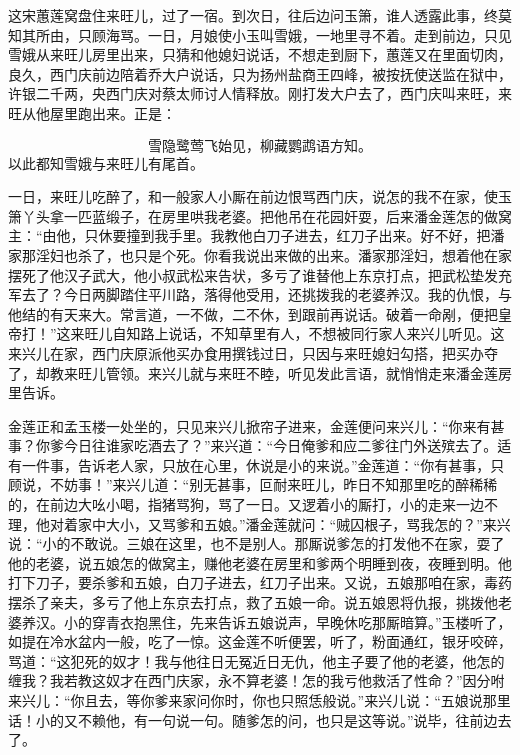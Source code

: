 这宋蕙莲窝盘住来旺儿，过了一宿。到次日，往后边问玉箫，谁人透露此事，终莫知其所由，只顾海骂。一日，月娘使小玉叫雪娥，一地里寻不着。走到前边，只见雪娥从来旺儿房里出来，只猜和他媳妇说话，不想走到厨下，蕙莲又在里面切肉，良久，西门庆前边陪着乔大户说话，只为扬州盐商王四峰，被按抚使送监在狱中，许银二千两，央西门庆对蔡太师讨人情释放。刚打发大户去了，西门庆叫来旺，来旺从他屋里跑出来。正是：

\[
雪隐鹭莺飞始见，柳藏鹦鹉语方知。
\]
以此都知雪娥与来旺儿有尾首。

一日，来旺儿吃醉了，和一般家人小厮在前边恨骂西门庆，说怎的我不在家，使玉箫丫头拿一匹蓝缎子，在房里哄我老婆。把他吊在花园奸耍，后来潘金莲怎的做窝主：“由他，只休要撞到我手里。我教他白刀子进去，红刀子出来。好不好，把潘家那淫妇也杀了，也只是个死。你看我说出来做的出来。潘家那淫妇，想着他在家摆死了他汉子武大，他小叔武松来告状，多亏了谁替他上东京打点，把武松垫发充军去了？今日两脚踏住平川路，落得他受用，还挑拨我的老婆养汉。我的仇恨，与他结的有天来大。常言道，一不做，二不休，到跟前再说话。破着一命剐，便把皇帝打！”这来旺儿自知路上说话，不知草里有人，不想被同行家人来兴儿听见。这来兴儿在家，西门庆原派他买办食用撰钱过日，只因与来旺媳妇勾搭，把买办夺了，却教来旺儿管领。来兴儿就与来旺不睦，听见发此言语，就悄悄走来潘金莲房里告诉。

金莲正和孟玉楼一处坐的，只见来兴儿掀帘子进来，金莲便问来兴儿：“你来有甚事？你爹今日往谁家吃酒去了？”来兴道：“今日俺爹和应二爹往门外送殡去了。适有一件事，告诉老人家，只放在心里，休说是小的来说。”金莲道：“你有甚事，只顾说，不妨事！”来兴儿道：“别无甚事，叵耐来旺儿，昨日不知那里吃的醉稀稀的，在前边大吆小喝，指猪骂狗，骂了一日。又逻着小的厮打，小的走来一边不理，他对着家中大小，又骂爹和五娘。”潘金莲就问：“贼囚根子，骂我怎的？”来兴说：“小的不敢说。三娘在这里，也不是别人。那厮说爹怎的打发他不在家，耍了他的老婆，说五娘怎的做窝主，赚他老婆在房里和爹两个明睡到夜，夜睡到明。他打下刀子，要杀爹和五娘，白刀子进去，红刀子出来。又说，五娘那咱在家，毒药摆杀了亲夫，多亏了他上东京去打点，救了五娘一命。说五娘恩将仇报，挑拨他老婆养汉。小的穿青衣抱黑住，先来告诉五娘说声，早晚休吃那厮暗算。”玉楼听了，如提在冷水盆内一般，吃了一惊。这金莲不听便罢，听了，粉面通红，银牙咬碎，骂道：“这犯死的奴才！我与他往日无冤近日无仇，他主子要了他的老婆，他怎的缠我？我若教这奴才在西门庆家，永不算老婆！怎的我亏他救活了性命？”因分咐来兴儿：“你且去，等你爹来家问你时，你也只照恁般说。”来兴儿说：“五娘说那里话！小的又不赖他，有一句说一句。随爹怎的问，也只是这等说。”说毕，往前边去了。

